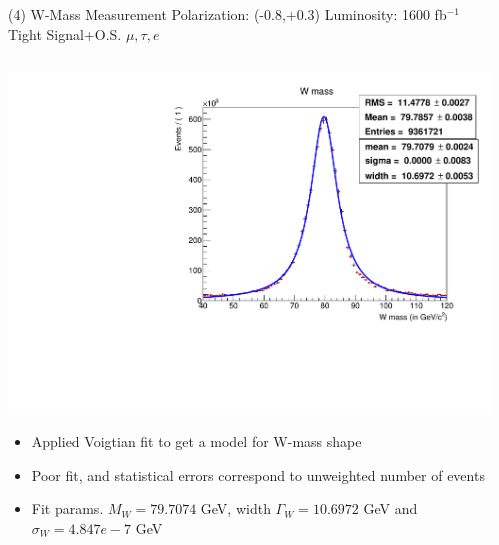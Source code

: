 \documentclass[10pt]{beamer}
\begin{document}
\begin{frame}{(4) W-Mass Measurement }
\scriptsize
Polarization: (-0.8,+0.3)\quad
Luminosity: 1600 fb$^{-1}$\\
Tight Signal+O.S. $\mu ,\tau , e$\\
\scriptsize
\begin{columns}
\begin{column}{0.5\textwidth}

\includegraphics[scale=0.3, left]{WWSfit.pdf} \\
\begin{itemize}
\scriptsize
\item Applied Voigtian fit to get a model for W-mass shape
\item Poor fit, and statistical errors correspond to unweighted number of events
\item Fit params. $M_W = 79.7074$ GeV, width $\Gamma_W = 10.6972$ GeV and $\sigma_W = 4.847e-7$ GeV
\end{itemize}
\end{column}
\begin{column}{0.5\textwidth}


\end{column}
\end{columns}
\end{frame}
\end{document}
